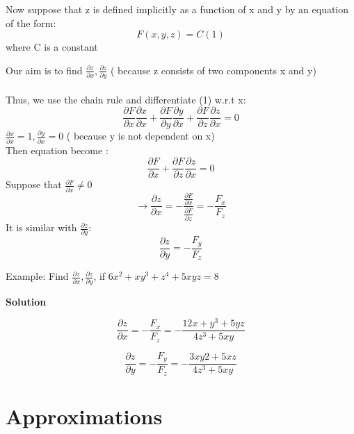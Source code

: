 \documentclass[12pt]{article}
\begin{document}
\begin{mybox}
    Now suppose that z is defined implicitly as a function of x and y by
an equation of the form: 
$$F(x,y,z) = C (1) $$ where C is a constant

\end{mybox}
Our aim is to find $\frac{\partial z}{\partial x}, \frac{\partial z}{\partial y}$ ( because z consists of two components x and y)\\
\\
Thus, we use the chain rule and differentiate (1) w.r.t x: \\
$$\frac{ \partial F}{\partial x}\frac{\partial x}{\partial x}+\frac{ \partial F}{\partial y}\frac{\partial y}{\partial x} + \frac{ \partial F}{\partial z}\frac{\partial z}{\partial x} = 0 $$
 $\frac{\partial x}{\partial x} = 1  ,\frac{\partial y}{\partial x} = 0$ ( because y is not dependent on x)\\
 Then equation become :\\
 $$ \frac{ \partial F}{\partial x} + \frac{ \partial F}{\partial z}\frac{\partial z}{\partial x} = 0 $$
 Suppose that $ \frac{ \partial F}{\partial x} \neq 0$  \\
 $$\rightarrow \frac{\partial z}{\partial x} = - \frac{\frac{ \partial F}{\partial x}}{\frac{ \partial F}{\partial z}} = -\frac{F_x}{F_z}  $$
 It is similar with $\frac{\partial z}{\partial y}$:
 $$\frac{\partial z}{\partial y} = -\frac{F_y}{F_z} $$
 

 Example: Find $\frac{\partial z}{\partial x}, \frac{\partial z}{\partial y}$, if $6x^2 +xy^3 + z^4 +5xyz = 8$
 \begin{center}
     \textbf{Solution} 
 \end{center}
  $$\frac{\partial z}{\partial x} = -\frac{F_x}{F_z}  = -\frac{12x+y^3+5yz}{4z^3 + 5xy}$$ 
  
  $$\frac{\partial z}{\partial y} = -\frac{F_y}{F_z} = -\frac{3xy2+5xz}{4z^3+5xy}$$
 
\section{ Approximations}
\end{document}
